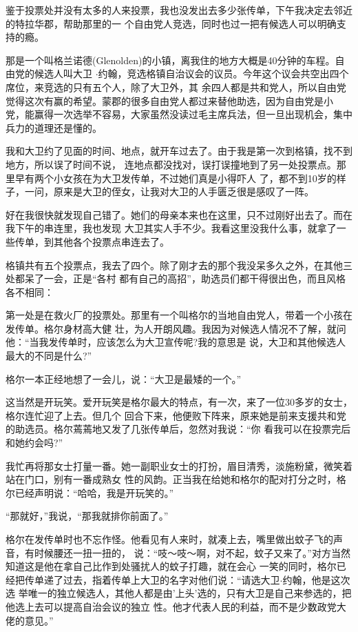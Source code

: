 ﻿\documentclass[11pt]{article}
\begin{document}
鉴于投票处并没有太多的人来投票，我也没发出去多少张传单，下午我决定去邻近的特拉华郡，帮助那里的一
个自由党人竞选，同时也过一把有候选人可以明确支持的瘾。

那是一个叫格兰诺德(Glenolden)的小镇，离我住的地方大概是40分钟的车程。自由党的候选人叫大卫
$\cdot$约翰，竞选格镇自治议会的议员。今年这个议会共空出四个席位，来竞选的只有五个人，除了大卫外，其
余四人都是共和党人，所以自由党觉得这次有赢的希望。蒙郡的很多自由党人都过来替他助选，因为自由党是小
党，能赢得一次选举不容易，大家虽然没读过毛主席兵法，但一旦出现机会，集中兵力的道理还是懂的。

我和大卫约了见面的时间、地点，就开车过去了。由于我是第一次到格镇，找不到地方，所以误了时间不说，
连地点都没找对，误打误撞地到了另一处投票点。那里早有两个小女孩在为大卫发传单，不过她们真是小得吓人
了，都不到10岁的样子，一问，原来是大卫的侄女，让我对大卫的人手匮乏很是感叹了一阵。

好在我很快就发现自己错了。她们的母亲本来也在这里，只不过刚好出去了。而在我下午的串连里，我也发现
大卫其实人手不少。我看这里没我什么事，就拿了一些传单，到其他各个投票点串连去了。

格镇共有五个投票点，我去了四个。除了刚才去的那个我没呆多久之外，在其他三处都呆了一会，正是``各村
都有自己的高招''，助选员们都干得很出色，而且风格各不相同：

第一处是在救火厂的投票处。那里有一个叫格尔的当地自由党人，带着一个小孩在发传单。格尔身材高大健
壮，为人开朗风趣。我因为对候选人情况不了解，就问他：``当我发传单时，应该怎么为大卫宣传呢?我的意思是
说，大卫和其他候选人最大的不同是什么?''

格尔一本正经地想了一会儿，说：``大卫是最矮的一个。''

这当然是开玩笑。爱开玩笑是格尔最大的特点，有一次，来了一位30多岁的女士，格尔连忙迎了上去。但几个
回合下来，他便败下阵来，原来她是前来支援共和党的助选员。格尔蔫蔫地又发了几张传单后，忽然对我说：``你
看我可以在投票完后和她约会吗?''

我忙再将那女士打量一番。她一副职业女士的打扮，眉目清秀，淡施粉黛，微笑着站在门口，别有一番成熟女
性的风韵。正当我在给她和格尔的配对打分之时，格尔已经声明说：``哈哈，我是开玩笑的。''

``那就好，''我说，``那我就排你前面了。''

格尔在发传单时也不忘作怪。他看见有人来时，就凑上去，嘴里做出蚊子飞的声音，有时候腰还一扭一扭的，
说：``吱～吱～啊，对不起，蚊子又来了。''对方当然知道这是他在拿自己比作到处骚扰人的蚊子打趣，就在会心
一笑的同时，格尔已经把传单递了过去，指着传单上大卫的名字对他们说：``请选大卫$\cdot$约翰，他是这次选
举唯一的独立候选人，其他人都是由'上头'选的，只有大卫是自己来参选的，把他选上去可以提高自治会议的独立
性。他才代表人民的利益，而不是少数政党大佬的意见。''
\end{document}
